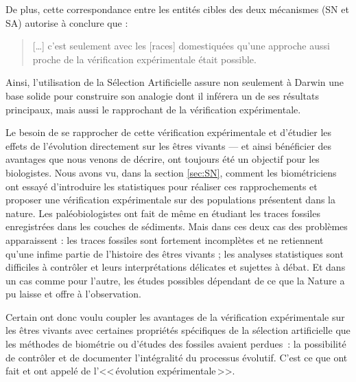 De plus, cette correspondance entre les entités cibles des deux mécanismes (SN et SA) autorise \citet[p. 140]{evans84darwinsuseanalogybetweenartificialnaturalselection} à conclure que :
\begin{quote}
	[\ldots] c'est seulement avec les [races] domestiquées qu'une approche aussi proche de la vérification expérimentale était possible. 
\end{quote}

Ainsi, l'utilisation de la Sélection Artificielle assure non seulement à Darwin une base solide pour construire son analogie dont il inférera un de ses résultats principaux, mais aussi le rapprochant de la vérification expérimentale. 

Le besoin de se rapprocher de cette vérification expérimentale et d'étudier les effets de l'évolution directement sur les êtres vivants --- et ainsi bénéficier des avantages que nous venons de décrire, ont toujours été un objectif pour les biologistes. Nous avons vu, dans la section \ref{sec:SN}, comment les biométriciens ont essayé d'introduire les statistiques pour réaliser ces rapprochements et proposer une vérification expérimentale sur des populations présentent dans la nature. Les paléobiologistes ont fait de même en étudiant les traces fossiles enregistrées dans les couches de sédiments. Mais dans ces deux cas des problèmes apparaissent : les traces fossiles sont fortement incomplètes et ne retiennent qu'une infime partie de l'histoire des êtres vivants ; les analyses statistiques sont difficiles à contrôler et leurs interprétations délicates et sujettes à débat. Et dans un cas comme pour l'autre, les études possibles dépendant de ce que la Nature a pu laisse et offre à l'observation.

Certain ont donc voulu coupler les avantages de la vérification expérimentale sur les êtres vivants avec certaines propriétés spécifiques de la sélection artificielle que les méthodes de biométrie ou d'études des fossiles avaient perdues~: la possibilité de contrôler et de documenter l'intégralité du processus évolutif. C'est ce que \cite{elena03evolutionexperimentsmicroorganismsdynamicsgeneticbasesadaptation,lenski94dynamicsadaptationdiversification10000generationexperimentbacterialpopulations} ont fait et ont appelé de l'<<\,évolution expérimentale\,>>.

